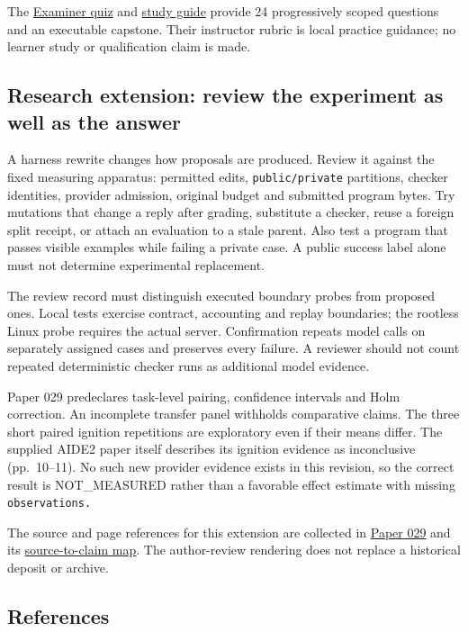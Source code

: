 \documentclass[
  11pt,
]{article}
\begin{document}
The \href{_lev_examiner_theoretical_minimum_quiz/quiz.md}{Examiner quiz} and
\href{_lev_examiner_theoretical_minimum_quiz/study_guide.md}{study guide}
provide 24 progressively scoped questions and an executable capstone.
Their instructor rubric is local practice guidance; no learner study or
qualification claim is made.

\subsection{Research extension: review the experiment as well as the
answer}\label{research-extension-review-the-experiment-as-well-as-the-answer}

A harness rewrite changes how proposals are produced. Review it against
the fixed measuring apparatus: permitted edits,
\nolinkurl{public/private} partitions, checker identities, provider
admission, original budget and submitted program bytes. Try mutations
that change a reply after grading, substitute a checker, reuse a foreign
split receipt, or attach an evaluation to a stale parent. Also test a
program that passes visible examples while failing a private case. A
public success label alone must not determine experimental replacement.

The review record must distinguish executed boundary probes from
proposed ones. Local tests exercise contract, accounting and replay
boundaries; the rootless Linux probe requires the actual server.
Confirmation repeats model calls on separately assigned cases and
preserves every failure. A reviewer should not count repeated
deterministic checker runs as additional model evidence.

Paper 029 predeclares task-level pairing, confidence intervals and Holm
correction. An incomplete transfer panel withholds comparative claims.
The three short paired ignition repetitions are exploratory even if
their means differ. The supplied AIDE2 paper itself describes its
ignition evidence as inconclusive (pp.~10--11). No such new provider
evidence exists in this revision, so the correct result is NOT\_MEASURED
rather than a favorable effect estimate with missing
\nolinkurl{observations.}

The source and page references for this extension are collected in
\href{../029/paper.pdf}{Paper 029} and its
\href{../029/docs/source_to_claim_map.md}{source-to-claim map}. The
author-review rendering does not replace a historical deposit or
archive.

\subsection{References}\label{references}
\end{document}
